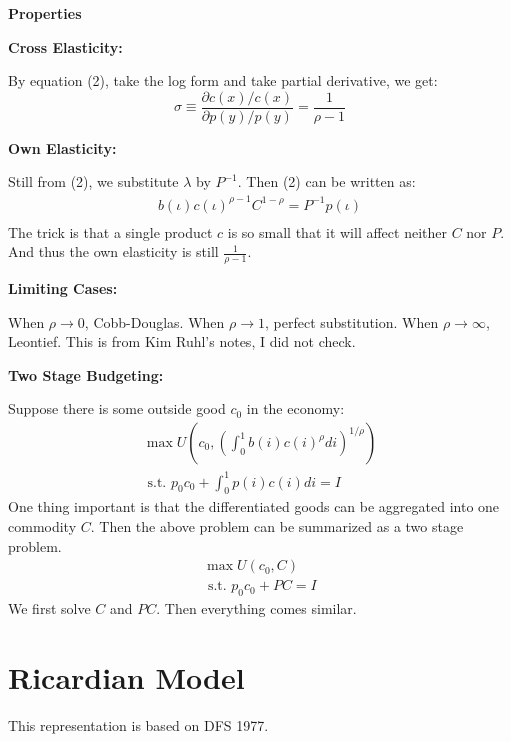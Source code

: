 \documentclass{book}
\theoremstyle{plain}
\theoremstyle{definition}
\newcommand{\blue}[1]{{\color{blue} #1}}
\newcommand{\mytitle}[1]{{\large{\textbf{#1}}}}
\newcommand{\mysubtitle}[1]{{\normalsize{\textbf{#1}}}}
\begin{document}
\mytitle{Properties}

\mysubtitle{Cross Elasticity:}

By equation (2), take the log form and take partial derivative, we get:
\[
\sigma  \equiv \frac{\partial c(x)/ c(x)}{\partial p(y)/p(y)} = \frac{1}{\rho-1}\]

\mysubtitle{Own Elasticity:}

Still from (2), we substitute $\lambda$ by $P^{-1}$. Then (2) can be written as:
\begin{align*}
	b(\iota)c(\iota)^{\rho-1}C^{1-\rho} = P^{-1}p(\iota)\\
\end{align*}
The trick is that a single product $c$ is so small that it will affect neither $C$ nor $P$. And thus the own elasticity is still $\frac{1}{\rho-1}$.

\mysubtitle{Limiting Cases:}

When $\rho \rightarrow 0$, Cobb-Douglas. When $\rho \rightarrow 1$, perfect substitution. When $\rho \rightarrow \infty$, Leontief.
\blue{This is from Kim Ruhl's notes, I did not check.}


\mysubtitle{Two Stage Budgeting:}

Suppose there is some outside good $c_0$ in the economy:
\[\begin{array} { c } { \max U \left( c _ { 0 } , \left( \int _ { 0 } ^ { 1 } b ( i ) c ( i ) ^ { \rho } d i \right) ^ { 1 / \rho } \right) } \\ { \text { s.t. } p _ { 0 } c _ { 0 } + \int _ { 0 } ^ { 1 } p ( i ) c ( i ) d i = I } \end{array}\]
One thing important is that the differentiated goods can be aggregated into one commodity $C$. Then the above problem can be summarized as a two stage problem.
\[\begin{array} { c } { \max U \left( c _ { 0 } , C \right) } \\ { \text { s.t. } p _ { 0 } c _ { 0 } + P C = I } \end{array}\]
We first solve $C$ and $PC$. Then everything comes similar.




\section{Ricardian Model} %
\label{sec:ricardian_model}

This representation is based on DFS 1977.
\end{document}
